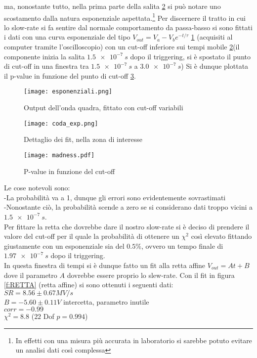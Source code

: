 ma, nonostante tutto, nella prima parte della salita \ref{f:EXPD} si può notare uno scostamento dalla natura esponenziale aspettata.\footnote{In effetti con una misura più accurata in laboratorio si sarebbe potuto evitare un analisi dati così complessa}
Per discernere il tratto in cui lo slow-rate si fa sentire dal normale comportamento da passa-basso si sono fittati i dati con una curva esponenziale del tipo $V_{out}=V_a-V_be^{-t/\tau}$ \ref{f:EXP} (acquisiti al computer tramite l'oscilloscopio) con un cut-off inferiore sui tempi mobile \ref{f:EXPD}(il componente inizia la salita  $\SI{1.5e-7}{s}$ dopo il triggering, si è spostato il punto di cut-off in una finestra tra $\SI{1.5e-7}{s}$ a $\SI{3.0e-7}{s}$) Si è dunque plottata il p-value in funzione del punto di cut-off \ref{f:MAD}.

\begin{figure}[h]
	\centering
	\texttt{[image: esponenziali.png]}     %
	\caption{Output dell'onda quadra, fittato con cut-off variabili}
	\label{f:EXP}
\end{figure}

\begin{figure}[h]
	\centering
	\texttt{[image: coda\_exp.png]}
	\caption{Dettaglio dei fit, nella zona di interesse}
	\label{f:EXPD}
\end{figure}

\begin{figure}[h]
	\centering
	\texttt{[image: madness.pdf]}
	\caption{P-value in funzione del cut-off}
	\label{f:MAD}
\end{figure}

Le cose notevoli sono:\\
-La probabilità va a 1, dunque gli errori sono evidentemente sovrastimati\\
-Nonostante ciò, la probabilità scende a zero se si considerano dati troppo vicini a $\SI{1.5e-7}{s}$.\\
Per fittare la retta che dovrebbe dare il nostro slow-rate si è deciso di prendere il valore del cut-off per il quale la probabilità di ottenere un $\chi^2$ così elevato fittando giustamente con un esponenziale sia del $0.5 \%$, ovvero un tempo finale di $\SI{1.97e-7}{s}$ dopo il triggering.\\
In questa finestra di tempi si è dunque fatto un fit alla retta affine $V_{out}=At+B$ dove il parametro $A$ dovrebbe essere proprio lo slew-rate.
Con il fit in figura \ref{f:RETTA} (retta affine) si sono ottenuti i seguenti dati:\\
$SR={8.56 \pm 0.67}{MV/s}$\\
$B={-5.60\pm 0.11}{V}$ intercetta, parametro inutile\\
$corr=-0.99$\\
$\chi^2=8.8$ ($22$ Dof $p=0.994$)\\

